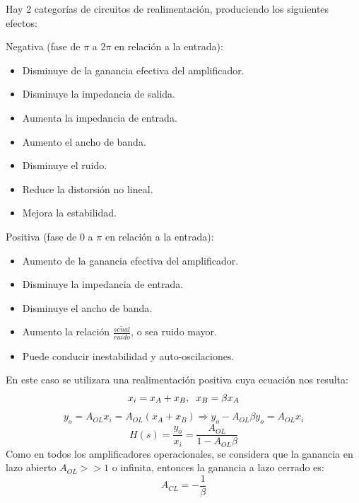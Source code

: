 Hay 2 categorías de circuitos de realimentación, produciendo los siguientes efectos:

\begin{itemize}
    \begin{minipage}{.49\textwidth}
         \item Negativa (fase de $\pi$ a $2\pi$ en relación a la entrada): 
        \begin{itemize}
            \item Disminuye de la ganancia efectiva del amplificador.
            \item Disminuye la impedancia de salida.
            \item Aumenta la impedancia de entrada.
            \item Aumento el ancho de banda.
            \item Disminuye el ruido.
            \item Reduce la distorsión no lineal.
            \item Mejora la estabilidad.
        \end{itemize}
    \end{minipage}
    \begin{minipage}{.45\textwidth}
        \item Positiva (fase de $0$ a $\pi$ en relación a la entrada): 
        \begin{itemize}
            \item Aumento de la ganancia efectiva del amplificador.
            \item Disminuye la impedancia de entrada.
            \item Disminuye el ancho de banda.
            \item Aumento la relación $\frac{se \tilde{n} al}{ruido}$, o sea ruido mayor.
            \item Puede conducir inestabilidad y auto-oscilaciones.
        \end{itemize}
    \end{minipage}
\end{itemize}

En este caso se utilizara una realimentación positiva cuya ecuación nos resulta:
$$x_i = x_A + x_B, \hspace{0.2cm} x_B = \beta x_A$$
$$y_o = A_{OL} x_i = A_{OL} (x_A + x_B) \Longrightarrow y_o - A_{OL} \beta y_o = A_{OL} x_i$$
$$H(s) = \frac{y_o}{x_i} = \frac{A_{OL}}{1-A_{OL}\beta}$$
Como en todos los amplificadores operacionales, se considera que la ganancia en lazo abierto $A_{OL}>>1$ o infinita, entonces la ganancia a lazo cerrado es:
$$A_{CL} = -\frac{1}{\beta}$$

